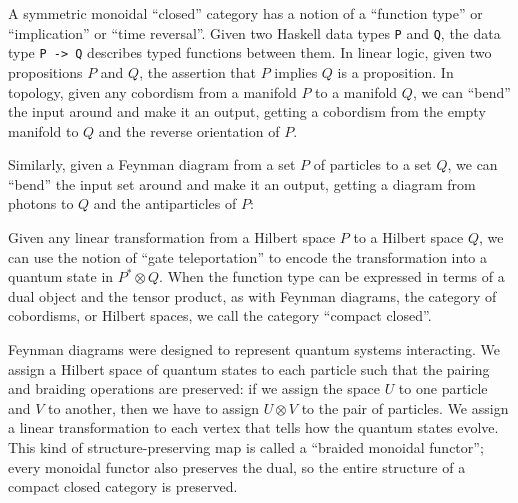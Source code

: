 \documentclass[12pt,twoside,openright]{report}
\newcommand{\identc}{
  \begin{scope}[left color=gray, right color=white]
    \shadedraw (.5,0) -- (.5,2.5) -- (-.5,2.5) -- (-.5,0) 
      .. controls (-.4,-.25) and (.4,-.25) .. (.5,0);
    \shadedraw (0,2.5) ellipse (.5 and .2);
  \end{scope}
  \draw[dashed] (0.5,0) arc (0:180:.5 and 0.2);
}
\newcommand{\zagc}{
  \begin{scope}[left color=gray, right color=white]
    \shadedraw (1.5,0) .. controls (1.6,2) and (-1.6,2) .. (-1.5,0)
      .. controls (-1.4,-.25) and (-.6,-.25) .. (-.5,0)
      .. controls (-.6,.8) and (0.6,.8) .. (.5,0)
      .. controls (.6,-.25) and (1.4,-.25) .. (1.5,0);
  \end{scope}
  \draw [dashed] (1.5, 0) arc (0:180:.5 and 0.2);
  \draw [dashed] (-.5, 0) arc (0:180:.5 and 0.2);
}
\begin{document}
A symmetric monoidal ``closed'' category has a notion of a ``function type'' or ``implication'' or ``time reversal''.  Given two Haskell data types {\tt P} and {\tt Q}, the data type {\tt P -> Q} describes typed functions between them.  In linear logic, given two propositions $P$ and $Q$, the assertion that $P$ implies $Q$ is a proposition.  In topology, given any cobordism from a manifold $P$ to a manifold $Q$, we can ``bend'' the input around and make it an output, getting a cobordism from the empty manifold to $Q$ and the reverse orientation of $P$.  
\begin{center}
\end{center}
Similarly, given a Feynman diagram from a set $P$ of particles to a set $Q$, we can ``bend'' the input set around and make it an output, getting a diagram from photons to $Q$ and the antiparticles of $P$:
\begin{center}
\end{center}
Given any linear transformation from a Hilbert space $P$ to a Hilbert space $Q$, we can use the notion of ``gate teleportation'' \cite{GC} to encode the transformation into a quantum state in $P^* \otimes Q.$  When the function type can be expressed in terms of a dual object and the tensor product, as with Feynman diagrams, the category of cobordisms, or Hilbert spaces, we call the category ``compact closed''.

Feynman diagrams were designed to represent quantum systems interacting.  We assign a Hilbert space of quantum states to each particle such that the pairing and braiding operations are preserved: if we assign the space $U$ to one particle and $V$ to another, then we have to assign $U \otimes V$ to the pair of particles.  We assign a linear transformation to each vertex that tells how the quantum states evolve.  This kind of structure-preserving map is called a ``braided monoidal functor''; every monoidal functor also preserves the dual, so the entire structure of a compact closed category is preserved.
\end{document}
